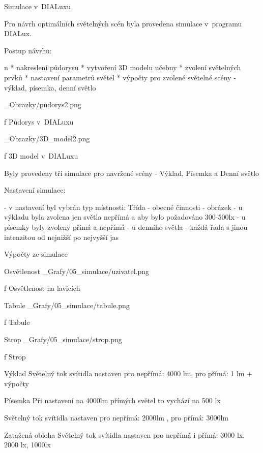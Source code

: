 \chap Simulace v~DIALuxu

Pro návrh optimálních světelných scén byla provedena simulace v~programu DIALux.

\medskip
Postup návrhu:

\begitems \style n
* nakreslení půdorysu
* vytvoření 3D modelu učebny
* zvolení světelných prvků
* nastavení parametrů světel
* výpočty pro zvolené světelné scény - výklad, písemka, denní světlo
\enditems
\medskip

\medskip {}
\picw=8cm _Obrazky/pudorys2.png
\caption/f Půdorys v~DIALuxu
\medskip

\medskip {}
\picw=8cm _Obrazky/3D_model2.png
\caption/f 3D model v~DIALuxu
\medskip

Byly provedeny tři simulace pro navržené scény - Výklad, Písemka a Denní světlo

Nastavení simulace:

- v nastavení byl vybrán typ místnosti: Třída - obecné činnosti
- obrázek
- u výkladu byla zvolena jen světla nepřímá a aby bylo požadováno 300-500lx
- u písemky byly zvoleny přímá a nepřímá 
- u denního světla - každá řada s jinou intenzitou od nejnižší po nejvyšší jas

Výpočty ze simulace

Osvětlenost
\medskip {}
\picw=15cm _Grafy/05_simulace/uzivatel.png
\caption/f Osvětlenost na lavicích
\medskip

Tabule
\medskip {}
\picw=8cm _Grafy/05_simulace/tabule.png
\caption/f Tabule
\medskip

Strop
\medskip {}
\picw=15cm _Grafy/05_simulace/strop.png
\caption/f Strop
\medskip



Výklad 
Světelný tok svítidla nastaven pro nepřímá: 4000 lm, pro přímá: 1 lm
+ výpočty

Písemka
Při nastavení na 4000lm přímých světel to vychází na 500 lx

Světelný tok svítidla nastaven pro nepřímá: 2000lm , pro přímá: 3000lm

Zatažená obloha
Světelný tok svítidla nastaven pro nepřímá i přímá: 3000 lx, 2000 lx, 1000lx